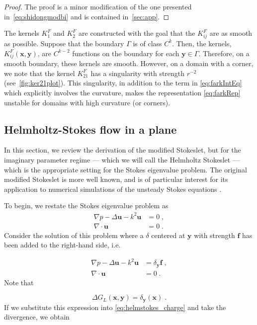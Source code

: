 \documentclass[preprint,12pt]{article}
\def\xx{{\boldsymbol x}}
\def\yy{{\boldsymbol y}}
\def\uu{{\boldsymbol u}}
\def\ff{{\boldsymbol f}}
\begin{document}
\begin{proof}
The proof is a minor modification of the one presented in~\ref{eq:shidongmodbi} and is contained in~\cref{sec:app}.
\end{proof}

The kernels $K^F_1$ and $K^F_2$ are
constructed with the goal that the $K^F_{ij}$ are
as smooth as possible. Suppose that the boundary
$\Gamma$ is of class $C^k$. Then, the kernels,
$K^F_{ij}(\xx,\yy)$, are $C^{k-2}$ functions on the boundary
for each $\yy \in \Gamma$.
Therefore, on a smooth
boundary, these kernels are smooth. However, on a
domain with a corner, we note 
that the kernel $K_{21}^F$
has a singularity with strength $r^{-2}$ (see~\cref{fig:ker21plot}). 
This singularity, in addition to the term in \cref{eq:farkIntEq}
which explicitly involves the
curvature, makes the representation \cref{eq:farkRep}
unstable for domains with high curvature (or
corners).

\subsection{Helmholtz-Stokes flow in a plane}

In this section, we review the derivation of the
modified Stokeslet, but for the imaginary parameter
regime --- which we will call the Helmholtz Stokeslet ---
which is the appropriate setting for the Stokes
eigenvalue problem.
The original modified Stokeslet is more well known,
and is of particular interest for its application to
numerical simulations of the unsteady Stokes equations
\cite{pozrikidis1992boundary,biros2002embedded}.

To begin, we restate the Stokes eigenvalue
problem as
\begin{align}
  \nabla p - \Delta \uu - k^2 \uu &= 0 \; , \label{eq:helmstokes}\\
  \nabla \cdot \uu &= 0 \; . \label{eq:helmstokescty}
\end{align}
Consider the solution of this problem where a
$\delta$ centered at $\yy$ with strength $\ff$
has been added to the right-hand side, i.e.

\begin{align}
  \nabla p - \Delta \uu - k^2 \uu &= \delta_\yy \ff \; ,
  \label{eq:helmstokes_charge} \\
  \nabla \cdot \uu &= 0 \; .
\end{align}
Note that

\begin{equation}
  \Delta G_L(\xx,\yy) = \delta_\yy(\xx) \; .
\end{equation}
If we substitute this expression into
\eqref{eq:helmstokes_charge} and take the divergence,
we obtain
\end{document}
